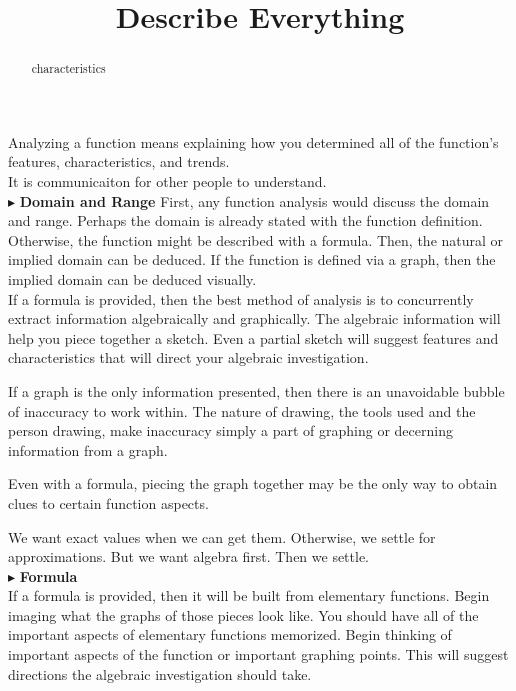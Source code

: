 \documentclass{ximera}
\title{Describe Everything}
\begin{document}
\begin{abstract}
characteristics
\end{abstract}
\maketitle




Analyzing a function means explaining how you determined all of the function's features, characteristics, and trends. \\

It is communicaiton for other people to understand. \\






$\blacktriangleright$ \textbf{\textcolor{red!10!blue!90!}{Domain and Range}}   
First, any function analysis would discuss the domain and range.  Perhaps the domain is already stated with the function definition. Otherwise, the function might be described with a formula. Then, the natural or implied domain can be deduced.  If the function is defined via a graph, then the implied domain can be deduced visually. \\

If a formula is provided, then the best method of analysis is to concurrently extract information algebraically and graphically.  The algebraic information will help you piece together a sketch.  Even a partial sketch will suggest features and characteristics that will direct your algebraic investigation.

If a graph is the only information presented, then there is an unavoidable bubble of inaccuracy to work within.  The nature of drawing, the tools used and the person drawing, make inaccuracy simply a part of graphing or decerning information from a graph.

Even with a formula, piecing the graph together may be the only way to obtain clues to certain function aspects. 

We want exact values when we can get them.  Otherwise, we settle for approximations. But we want algebra first.  Then we settle.\\





$\blacktriangleright$ \textbf{\textcolor{red!10!blue!90!}{Formula}}  \\
If a formula is provided, then it will be built from elementary functions.  Begin imaging what the graphs of those pieces look like. You should have all of the important aspects of elementary functions memorized. Begin thinking of important aspects of the function or important graphing points. This will suggest directions the algebraic investigation should take. \\
\end{document}
